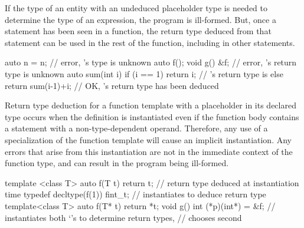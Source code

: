 \pnum
If the type of an entity with an undeduced placeholder type is needed to
determine the type of an expression, the program is ill-formed. But, once a
 statement has been seen in a function, the return type deduced
from that statement can be used in the rest of the function, including in other
 statements.
\enterexample
\begin{codeblock}
auto n = n;            // error, 's type is unknown
auto f();
void g() { &f; }       // error, 's return type is unknown
auto sum(int i) {
  if (i == 1)
    return i;          // 's return type is 
  else
    return sum(i-1)+i; // OK, 's return type has been deduced
}
\end{codeblock}
\exitexample

\pnum
Return type deduction for a function template with a placeholder in its
declared type occurs when the definition is instantiated even if the function
body contains a  statement with a non-type-dependent operand.
\enternote Therefore, any use of a specialization of the function template will
cause an implicit instantiation. Any errors that arise from this instantiation
are not in the immediate context of the function type, and can result in the
program being ill-formed. \exitnote
\enterexample
\begin{codeblock}
template <class T> auto f(T t) { return t; }  // return type deduced at instantiation time
typedef decltype(f(1)) fint_t;                // instantiates  to deduce return type
template<class T> auto f(T* t) { return *t; }
void g() { int (*p)(int*) = &f; }             // instantiates both `'s to determine return types,
                                              // chooses second
\end{codeblock}
\exitexample


